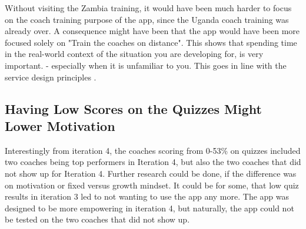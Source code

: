   Without visiting the Zambia training, it would have been much harder to focus on the coach training purpose of the app, since the Uganda coach training was already over. A consequence might have been that the app would have been more focused solely on "Train the coaches on distance". This shows that spending time in the real-world context of the situation you are developing for, is very important. - especially when it is unfamiliar to you. This goes in line with the service design principles \citep{stickdorn}.

  \subsection{Having Low Scores on the Quizzes Might Lower Motivation}
  Interestingly from iteration 4, the coaches scoring from 0-53\% on quizzes included two coaches being top performers in Iteration 4, but also the two coaches that did not show up for Iteration 4. Further research could be done, if the difference was on motivation or fixed versus growth mindset. It could be for some, that low quiz results in iteration 3 led to not wanting to use the app any more. The app was designed to be more empowering in iteration 4, but naturally, the app could not be tested on the two coaches that did not show up.
